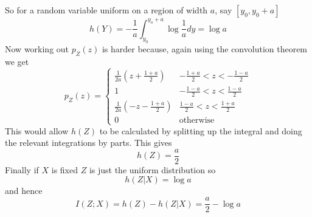 \documentclass[12pt]{article}
\begin{document}
So for a random variable uniform on a region of width $a$, say $[y_0,y_0+a]$
\begin{equation}
  h(Y)=-\frac{1}{a}\int_{y_0}^{y_o+a}\log{\frac{1}{a}}dy=\log{a}
\end{equation}
Now working out $p_Z(z)$ is harder because, again using the convolution theorem we get
\begin{equation}
  p_Z(z)=\left\{\begin{array}{ll}
  \frac{1}{2a}\left(z+\frac{1+a}{2}\right)&-\frac{1+a}{2}<z<-\frac{1-a}{2}\\
  1                                       &-\frac{1-a}{2}<z<\frac{1-a}{2}\\
  \frac{1}{2a}\left(-z-\frac{1+a}{2}\right)&\frac{1-a}{2}<z<\frac{1+a}{2}\\
  0&\mbox{otherwise}
  \end{array}\right.
\end{equation}
This would allow $h(Z)$ to be calculated by splitting up the integral and doing the relevant integrations by parts. This gives
\begin{equation}
  h(Z)=\frac{a}{2}
\end{equation}
Finally if $X$ is fixed $Z$ is just the uniform distribution so
\begin{equation}
  h(Z|X)=\log{a}
\end{equation}
and hence
\begin{equation}
  I(Z;X)=h(Z)-h(Z|X)=\frac{a}{2}-\log{a}
\end{equation}
\end{document}
